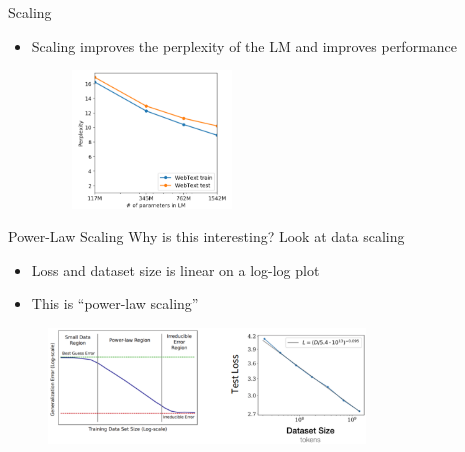 \documentclass[serif, aspectratio=169]{beamer}
\begin{document}
\begin{frame}{Scaling}
    \vspace{0.5cm}
    \begin{itemize}
        \item
            \large{Scaling improves the perplexity of the LM and improves performance}\\
            \vspace{0.3cm}
            \hspace{2.8cm}
            \begin{figure}
            \centering
            \includegraphics[width=0.4\textwidth]{pic/scaling gpt2.png}
            \caption{}
            \end{figure}
    \end{itemize}
\end{frame}

\begin{frame}{Power-Law Scaling}
    \Large{Why is this interesting? Look at data scaling}
    \begin{itemize}
        \item
            \large{Loss and dataset size is linear on a log-log plot}\\
            \vspace{0.1cm}
        \item 
            \large{This is “power-law scaling”}
            \vspace{}
    \end{itemize}
    \hspace{2cm}
    \begin{figure}
        \centering
        \includegraphics[width=0.75\textwidth]{pic/power low.png}
        \caption{}
    \end{figure}
\end{frame}
\end{document}
